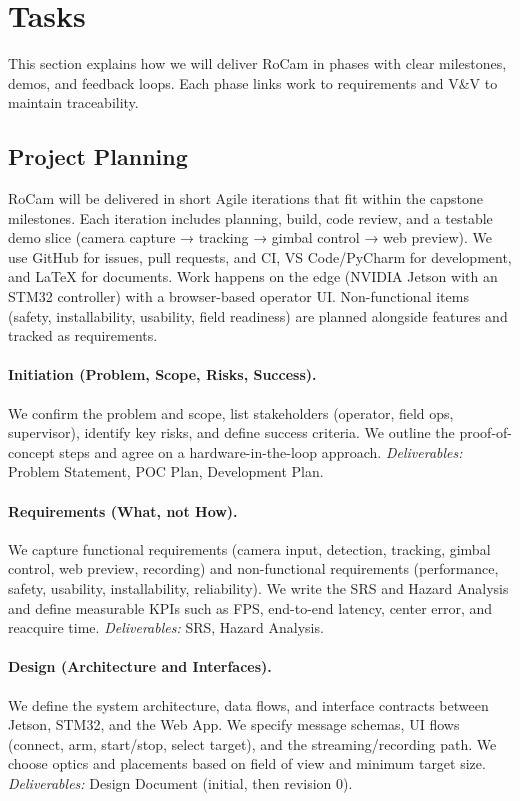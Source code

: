 \documentclass[12pt]{article}
\begin{document}

\section{Tasks}
This section explains how we will deliver RoCam in phases with clear milestones, demos, and feedback loops.
Each phase links work to requirements and V\&V to maintain traceability.
\subsection{Project Planning}

RoCam will be delivered in short Agile iterations that fit within the capstone
milestones. Each iteration includes planning, build, code review, and a
testable demo slice (camera capture → tracking → gimbal control → web preview).
We use GitHub for issues, pull requests, and CI, VS Code/PyCharm for
development, and LaTeX for documents. Work happens on the edge (NVIDIA Jetson
with an STM32 controller) with a browser-based operator UI. Non-functional
items (safety, installability, usability, field readiness) are planned
alongside features and tracked as requirements.

\paragraph{Initiation (Problem, Scope, Risks, Success).}
We confirm the problem and scope, list stakeholders (operator, field ops,
supervisor), identify key risks, and define success criteria. We outline the
proof-of-concept steps and agree on a hardware-in-the-loop approach.
\emph{Deliverables:} Problem Statement, POC Plan, Development Plan.

\paragraph{Requirements (What, not How).}
We capture functional requirements (camera input, detection, tracking, gimbal
control, web preview, recording) and non-functional requirements (performance,
safety, usability, installability, reliability). We write the SRS and Hazard
Analysis and define measurable KPIs such as FPS, end-to-end latency, center
error, and reacquire time. \emph{Deliverables:} SRS, Hazard Analysis.

\paragraph{Design (Architecture and Interfaces).}
We define the system architecture, data flows, and interface contracts between
Jetson, STM32, and the Web App. We specify message schemas, UI flows (connect,
arm, start/stop, select target), and the streaming/recording path. We choose
optics and placements based on field of view and minimum target size.
\emph{Deliverables:} Design Document (initial, then revision 0).
\end{document}
